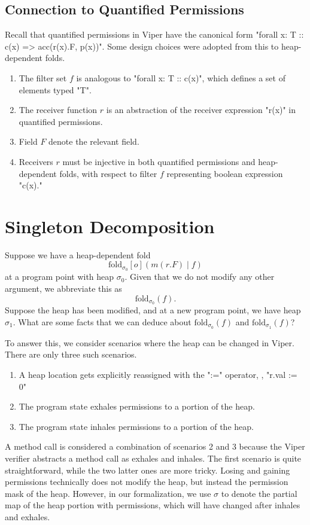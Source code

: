 \documentclass[msc,oneside]{ubcthesis}
\theoremstyle{definition}
\begin{document}
\subsection{Connection to Quantified Permissions}
Recall that quantified permissions in Viper have the canonical form "forall x: T :: c(x) => acc(r(x).F, p(x))". Some design choices were adopted from this to heap-dependent folds.

\begin{enumerate}
    \item The filter set $f$ is analogous to "forall x: T :: c(x)", which defines a set of elements typed "T".
    \item The receiver function $r$ is an abstraction of the receiver expression "r(x)" in quantified permissions.
    \item Field $F$ denote the relevant field.
    \item Receivers $r$ must be injective in both quantified permissions and heap-dependent folds, with respect to filter $f$ representing boolean expression "c(x)." 
\end{enumerate}

\section{Singleton Decomposition}
Suppose we have a heap-dependent fold $$\textrm{fold}_{\sigma_0}[o]( m(r.F) \mid f)$$ at a program point with heap $\sigma_0$. Given that we do not modify any other argument, we abbreviate this as $$\textrm{fold}_{\sigma_0}(f).$$ Suppose the heap has been modified, and at a new program point, we have heap $\sigma_1$. What are some facts that we can deduce about $\textrm{fold}_{\sigma_0}(f)$ and $\textrm{fold}_{\sigma_1}(f)$?

To answer this, we consider scenarios where the heap can be changed in Viper. There are only three such scenarios.
\begin{enumerate}
    \item A heap location gets explicitly reassigned with the ":=" operator, \eg, "r.val := 0"
    \item The program state exhales permissions to a portion of the heap. 
    \item The program state inhales permissions to a portion of the heap. 
\end{enumerate}
A method call is considered a combination of scenarios 2 and 3 because the Viper verifier abstracts a method call as exhales and inhales. The first scenario is quite straightforward, while the two latter ones are more tricky. Losing and gaining permissions technically does not modify the heap, but instead the permission mask of the heap. However, in our formalization, we use $\sigma$ to denote the partial map of the heap portion with permissions, which will have changed after inhales and exhales. 
\end{document}

